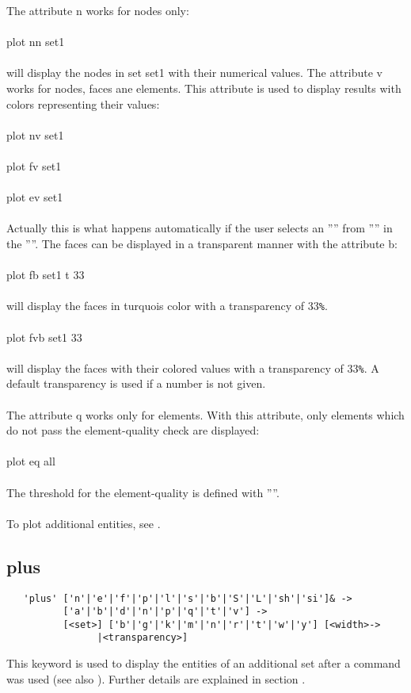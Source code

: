 \documentclass{article}
\begin{document}
The attribute n works for nodes only:\\\\plot nn set1\\\\will display the nodes in set set1 with their numerical values. The attribute v works for nodes, faces ane elements. This attribute is used to display results with colors representing their values:\\\\plot nv set1\\\\plot fv set1\\\\plot ev set1\\\\Actually this is what happens automatically if the user selects an '''' from '''' in the ''''. The faces can be displayed in a transparent manner with the attribute b:\\\\plot fb set1 t 33\\\\will display the faces in turquois color with a transparency of 33\verb_%_.\\\\plot fvb set1 33\\\\will display the faces with their colored values with a transparency of 33\verb_%_. A default transparency is used if a number is not given.\\\\
The attribute q works only for elements. With this attribute, only elements which do not pass the element-quality check are displayed:\\\\
plot eq all\\\\ The threshold for the element-quality is defined with ''''.\\\\
To plot additional entities, see .

\subsection{\label{plus}plus}
\begin{verbatim}
   'plus' ['n'|'e'|'f'|'p'|'l'|'s'|'b'|'S'|'L'|'sh'|'si']& ->
          ['a'|'b'|'d'|'n'|'p'|'q'|'t'|'v'] ->
          [<set>] ['b'|'g'|'k'|'m'|'n'|'r'|'t'|'w'|'y'] [<width>->
                |<transparency>] 
\end{verbatim}
This keyword is used to display the entities of an additional set after a  command was used (see also ). Further details are explained in section .
\end{document}
